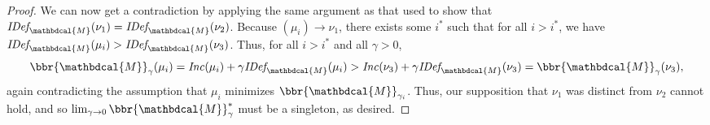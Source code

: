 \documentclass[letterpaper]{article} %
\theoremstyle{plain}
\theoremstyle{definition}
\theoremstyle{remark}
\newcommand{\dg}[1]{\mathbdcal{#1}}
\newcommand{\IDef}[1]{\mathit{IDef}_{\!#1}}
\newcommand\Inc{\mathit{Inc}}
\begin{document}
\begin{proof}
We can now get a contradiction by applying the same argument as that used to show
that $\IDef{\dg M}(\nu_1) =\IDef{\dg M}(\nu_2)$.  
    Because $(\mu_{i}) \to \nu_1$, there exists some
    $i^*$ such that for all $i > i^*$, we have $\IDef{\dg M}(\mu_{i}) >
    \IDef{\dg M}(\nu_3)$. Thus, for all $i > i^*$ and all
    $\gamma > 0$, 
    \[ \bbr{\dg M}_\gamma(\mu_{i}) = \Inc(\mu_{i}) + \gamma\IDef{\dg M}(\mu_{i}) > \Inc(\nu_3) 
    + \gamma \IDef{\dg M}(\nu_3) = \bbr{\dg M}_\gamma(\nu_3),\]
again contradicting the assumption that $\mu_{i}$ minimizes
$\bbr{\dg M}_{\gamma_{i}}$.
% 
%
Thus, our supposition that $\nu_1$ was distinct from $\nu_2$ cannot hold, and so
$\lim_{\gamma \to 0}\bbr{\dg M}_\gamma^*$ must be a singleton, as desired.
\end{proof}
\end{document}
